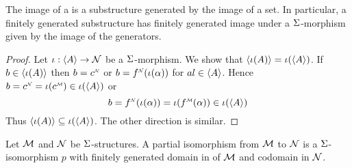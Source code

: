 \begin{prop}
    The image of a 
    is a substructure 
    generated by the image of a set.
    In particular,
    a finitely generated substructure has finitely generated image under a 
    $\Sigma$-morphism given by the image of the generators.
\end{prop}
\begin{proof}
    Let $\iota : \langle A\rangle \to \mathcal{N}$ be a $\Sigma$-morphism.
    We show that $\langle\iota(A)\rangle = \iota(\langle A\rangle)$.
    If $b \in \langle\iota(A)\rangle$ then $b = \nnintp{c}$ or $b = \nnintp{f}(\io(\al))$ 
    for $al \in \langle A\rangle$.
    Hence $b = \nnintp{c} = \io(\mmintp{c}) \in \io(\<A\>)$
    or 
    \[b = \nnintp{f}(\io(\al)) = \io(\mmintp{f}(\al)) \in \io(\<A\>)\]
    Thus $\langle\iota(A)\rangle \subseteq \iota(\langle A\rangle)$.
    The other direction is similar.
\end{proof}

\begin{dfn}
    Let $\mathcal{M}$ and $\mathcal{N}$ be $\Sigma$-structures.
    A partial isomorphism from $\mathcal{M}$ to $\mathcal{N}$ is a $\Sigma$-isomorphism $p$
    with finitely generated domain in of $\mathcal{M}$ 
    and codomain in $\mathcal{N}$.
\end{dfn}

